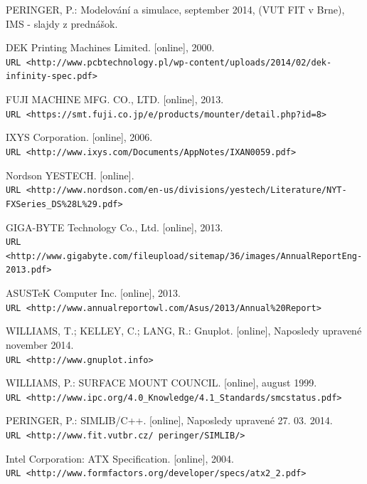 \documentclass[12pt,a4paper,titlepage,final]{article}
\begin{document}
\begin{thebibliography}{9}

PERINGER, P.: Modelování a simulace, september 2014, (VUT FIT v Brne), IMS - slajdy z
prednášok.

DEK Printing Machines Limited. [online], 2000.
\\\texttt{URL <http://www.pcbtechnology.pl/wp-content/uploads/2014/02/dek-infinity-spec.pdf>}

FUJI MACHINE MFG. CO., LTD. [online], 2013.
\\\texttt{URL <https://smt.fuji.co.jp/e/products/mounter/detail.php?id=8>}

IXYS Corporation. [online], 2006.
\\\texttt{URL <http://www.ixys.com/Documents/AppNotes/IXAN0059.pdf>}

Nordson YESTECH. [online].
\\\texttt{URL <http://www.nordson.com/en-us/divisions/yestech/Literature/NYT-FXSeries\_DS\%28L\%29.pdf>}

GIGA-BYTE Technology Co., Ltd. [online], 2013.
\\\texttt{URL <http://www.gigabyte.com/fileupload/sitemap/36/images/AnnualReportEng-2013.pdf>}

ASUSTeK Computer Inc. [online], 2013.
\\\texttt{URL <http://www.annualreportowl.com/Asus/2013/Annual\%20Report>}

WILLIAMS, T.; KELLEY, C.; LANG, R.: Gnuplot. [online], Naposledy upravené november 2014.
\\\texttt{URL <http://www.gnuplot.info>}

WILLIAMS, P.: SURFACE MOUNT COUNCIL. [online], august 1999.
\\\texttt{URL <http://www.ipc.org/4.0_Knowledge/4.1_Standards/smcstatus.pdf>}

PERINGER, P.: SIMLIB/C++. [online], Naposledy upravené 27. 03. 2014.
\\\texttt{URL <http://www.fit.vutbr.cz/~peringer/SIMLIB/>}

Intel Corporation: ATX Specification. [online], 2004.
\\\texttt{URL <http://www.formfactors.org/developer/specs/atx2_2.pdf>}

\end{thebibliography}
\end{document}
